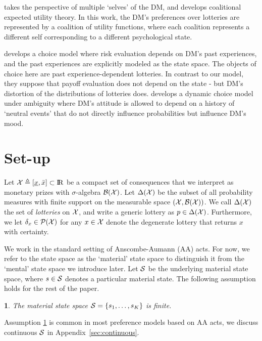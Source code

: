 \documentclass[11pt,oneside]{article}
\theoremstyle{plain}
\theoremstyle{plain}
\theoremstyle{plain}
\theoremstyle{plain}
\theoremstyle{plain}
\newtheorem{assumption}[thm]{\protect\assumptionname}
\theoremstyle{definition}
\theoremstyle{definition}
\theoremstyle{remark}
\theoremstyle{plain}
\providecommand{\assumptionname}{Assumption}
\newcommand{\R}{{\rm I\!R}}
\newcommand{\calpx}{{\cal P}({\cal X})}
\renewcommand{\Re}{\R}
\renewcommand{\Re}{\R}
\newcommand{\mcs}{{\cal S}}
\newcommand{\mcx}{{\cal X}}
\begin{document}
\cite{hara2019coalitional} takes the perspective of multiple `selves' of the DM, and develops coalitional expected utility theory.
In this work, the DM's preferences over lotteries are represented by a coalition of utility functions, where each coalition represents a different self corresponding to a different psychological state. 

\cite{cohen2008dynamic} develops a choice model where risk evaluation depends on DM's past experiences, and the past experiences are explicitly modeled as the state space. The objects of choice here are past experience-dependent lotteries.
In contrast to our model, they suppose that payoff evaluation does not depend on the state - but DM's distortion of the distributions of lotteries does.
\cite{etner2024dynamic} develops a dynamic choice model under ambiguity where DM's attitude is allowed to depend on a history of `neutral events' that do not directly influence probabilities but influence DM's mood.



\section{Set-up}
\label{sec:set-up}

Let $\mcx \triangleq [\underline{x}, \bar{x}] \subset \Re$ be a compact set of consequences that we interpret as monetary prizes with $\sigma$-algebra $\cal B(\mcx)$.
Let $\Delta(\mcx)$ be the subset of all probability measures with finite support on the measurable space $(\mcx, \cal B(\mcx))$. We call $\Delta(\mcx)$ the set of \emph{lotteries} on $\mcx$, and write a generic lottery as $p \in \Delta(\mcx)$.
Furthermore, we let $\delta_{x} \in \calpx$ for any $x \in \mcx$ denote the degenerate lottery that returns $x$ with certainty.

We work in the standard setting of Anscombe-Aumann (AA) acts.
For now, we refer to the state space as the `material' state space to distinguish it from the `mental' state space we introduce later.
Let $\mcs$ be the underlying material state space, where $s \in \mcs$ denotes a particular material state. The following assumption holds for the rest of the paper.

\begin{assumption}
    \label{assumption:material_state}
The material state space $\mcs = \{s_1, \ldots, s_K\}$ is finite.
\end{assumption}
\noindent
Assumption \ref{assumption:material_state} is common in most preference models based on AA acts, we discuss continuous $\mcs$ in Appendix~\ref{sec:continuous}.
\end{document}
